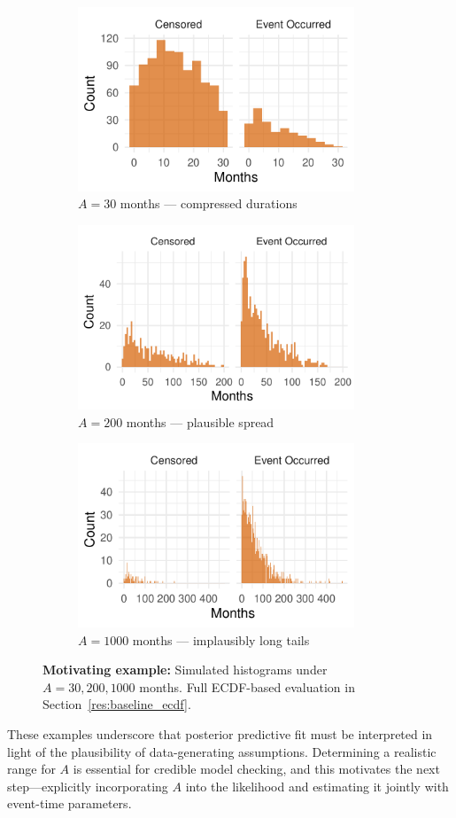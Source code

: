 \begin{example}
\begin{figure}[H]
\centering
\begin{subfigure}[t]{0.45\textwidth}
  \centering
  \includegraphics[height=5.5cm,width=\linewidth]{images/fake_duration_hist_a30.pdf}   %
  \caption{{\small $A=30$ months — compressed durations}}
  \label{fig:fake-hist_a30}
\end{subfigure}
\begin{subfigure}[t]{0.45\textwidth}
  \centering
  \includegraphics[height=5.5cm,width=\linewidth]{images/fake_duration_hist_a200.pdf}   %
  \caption{{\small $A=200$ months — plausible spread}}
  \label{fig:fake-hist_a200}
\end{subfigure}
\begin{subfigure}[t]{0.5\textwidth}
  \centering
  \includegraphics[height=5.5cm,width=\linewidth]{images/fake_duration_hist_a1000.pdf}   %
  \caption{{\small $A=1000$ months — implausibly long tails}}
  \label{fig:fake-hist_a1000}
\end{subfigure}
\caption{{\small \textbf{Motivating example:} Simulated histograms under $A=30,200,1000$ months. Full ECDF-based evaluation in Section~\ref{res:baseline_ecdf}.}}
\label{fig:ppc-A30}
\end{figure}
These examples underscore that posterior predictive fit must be interpreted in light of the plausibility of data-generating assumptions. Determining a realistic range for $A$ is essential for credible model checking, and this motivates the next step—explicitly incorporating $A$ into the likelihood and estimating it jointly with event-time parameters.
\end{example}